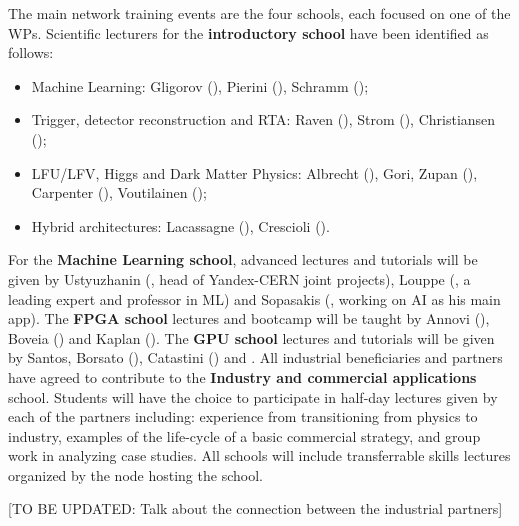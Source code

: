 The main network training events are the four schools,
each focused on one of the WPs. 
Scientific lecturers for the \textbf{introductory school} have been identified as follows:
\begin{itemize}
\item Machine Learning: Gligorov (\cnrsentity), Pierini (\cernentity), Schramm (\unigeentity);
\item Trigger, detector reconstruction and RTA: Raven (\nikhefentity), Strom (\ohioentity), Christiansen (\lundentity);
\item LFU/LFV, Higgs and Dark Matter Physics: Albrecht (\dortmundentity), Gori, Zupan (\cincinnatientity), Carpenter (\ohioentity), Voutilainen (\helsinkientity);
\item Hybrid architectures: Lacassagne (\sorbonneentity), Crescioli (\cnrsentity). 
\end{itemize}
For the \textbf{Machine Learning school}, advanced lectures and tutorials will be given by Ustyuzhanin (\yandex, head of Yandex-CERN joint projects), 
Louppe (\liegesentity, a leading expert and professor in ML) and Sopasakis (\ximantisentity, working on AI as his main app). 
The \textbf{FPGA school} lectures and bootcamp will be taught by Annovi (\pisaentity), Boveia (\cernentity) and Kaplan (\heidelberginstrumentsentity). 
The \textbf{GPU school} lectures and tutorials will be given by Santos, Borsato (\santiagoentity), Catastini (\lightboxentity) and . 
All industrial beneficiaries and partners have agreed to contribute to the \textbf{Industry and commercial applications} school.
Students will have the choice to participate in half-day lectures given by each of the partners including: experience from transitioning from physics to industry, examples of the life-cycle of a basic commercial strategy, and group work in analyzing case studies. 
All schools will include transferrable skills lectures organized by the node hosting the school. 

[TO BE UPDATED: Talk about the connection between the industrial partners]


